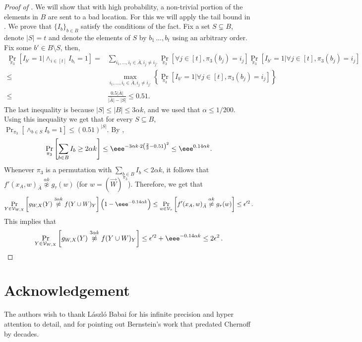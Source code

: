 \documentclass{toc}
\newcommand{\Prob}[2][]{\Pr_{{#1}}\left[#2\right]} %
\newcommand{\Paren}[1]{\left(#1\right)} %
\newcommand{\Brac}[1]{\left[#1\right]} %
\newcommand{\abs}[1]{\lvert#1\rvert} %
\newcommand{\set}[1]{\{#1\}} %
\newcommand{\Set}[1]{\left\{#1\right\}} %
\newcommand\f{f} %
\newcommand\setf{f} %
\newcommand{\g}{g} %
\newcommand\neqg[1]{\stackrel{{#1}}{ \not\approx}} %
\newcommand\cons{\mathcal{V}} %
\newcommand\rest[1]{{\bar{#1}}}  %
\begin{document}
\begin{proof}[Proof of ]
	We will show that with high probability, a non-trivial portion of the elements in $B$ are sent to a bad location. For this we will apply the tail bound in . We prove that $\set{I_b}_{b\in B}$ satisfy the conditions of the fact.
	Fix a set $S\subsetneq B$, denote $\abs{S}=t$ and denote  the elements of $S$ by $b_1\,\ldots,b_t$ using an arbitrary order. Fix some $b'\in B\setminus S$, then,
	\begin{align*}
		\Pr_{\pi_3}[I_{b'}=1|\wedge_{i\in[t]}I_{b_i}=1] =& \sum_{i_1,\ldots,i_{t}\in\rest{A},i_j\neq i_{j'}}\Pr_{\pi_3}\Brac{\forall j\in [t],\pi_3(b_j)=i_j}\Pr_{\pi_3}\Brac{I_{b'}=1|\forall j\in [t],\pi_3(b_j)=i_j}\\ \leq&\max_{i_1,\ldots,i_{t}\in\rest{A},i_j\neq i_{j'}}\Set{\Pr_{\pi_3}\Brac{I_{b'}=1|\forall j\in [t],\pi_3(b_j)=i_j}}\\
		\leq& \frac{0.5\abs{\rest{A}}}{\abs{\rest{A}} - \abs{S}}\leq 0.51.
	\end{align*}
	The last inequality is because $\abs{S}\leq\abs{B}\leq 3\alpha k$, and we used that $\alpha \leq 1/200$. Using this inequality we get that for every $S\subseteq B$, $\Pr_{\pi_3}\Brac{\wedge_{b\in S}I_b=1}\leq (0.51)^{\abs{S}}$.
	By ,
	\[ \Pr_{\pi_3}\Brac{\sum_{b\in B}I_b \geq 2\alpha k}\leq \eee^{-3\alpha k \cdot 2\Paren{\frac{2}{3}-0.51}^2}\leq \eee^{0.14 \alpha k}.  \]
	Whenever $\pi_3$ is a permutation with $\sum_{b\in B}I_b < 2\alpha k$, it follows that $\f'(x_A,w)_\rest{A}\neqg{\alpha k} \g_\tau(w)$ (for $w=(\vec W)^{\pi_3}$).
	Therefore, we get that
\[ \Prob[Y\in \cons_{W,X}]{\g_{W,X}(Y)\neqg{3\alpha k} \setf(Y\cup W)_Y}
%
\left(1-\eee^{-0.14\alpha k} \right)   %
\leq \Prob[w\in \cons_\tau]{\f'(x_A,w)_\rest{A}\neqg{\alpha k} \g_\tau(w)}\leq\epsilon'^2\,.\]
%
This implies that  %
	\[\Prob[Y\in \cons_{W,X}]{\g_{W,X}(Y)\neqg{3\alpha k} \setf(Y\cup W)_Y}\leq\epsilon'^2 + 
%
\eee^{-0.14\alpha k} \leq 2\epsilon^2\,.   %
 \qedhere \]    %
\end{proof}

\section*{Acknowledgement}
The authors wish to thank L\'aszl\'o Babai for his infinite precision 
and hyper attention to detail, and for pointing out Bernstein's work 
that predated Chernoff by decades.



%
%
%
%
%

\end{document}
